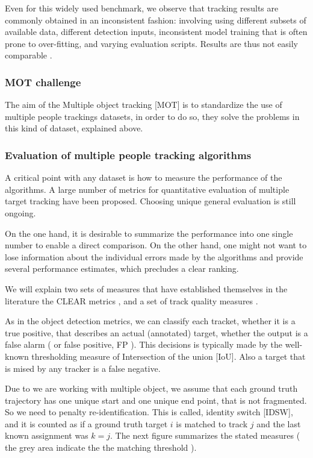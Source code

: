\documentclass[12pt, a4paper, titlepage,twoside,openright]{article}
\begin{document}
Even for this widely used benchmark, we observe that tracking results are commonly obtained in an inconsistent fashion: involving using different subsets of available data, different detection inputs, inconsistent model training that is often prone to over-fitting, and varying evaluation scripts. Results are thus not easily comparable \cite{mot}.


\subsubsection{MOT challenge}

The aim of the Multiple object tracking [MOT] is to standardize the use of multiple people trackings datasets, in order to do so, they solve the problems in this kind of dataset, explained above.


\subsubsection{Evaluation of multiple people tracking algorithms}

A critical point with any dataset is how to measure the performance of the algorithms. A large number of metrics for quantitative evaluation of multiple target tracking have been proposed. Choosing unique general evaluation is still ongoing. 

On the one hand, it is desirable to summarize the performance into one single number to enable a direct comparison. On the other hand, one might not want to lose information about the individual errors made by the algorithms and provide several performance estimates, which precludes a clear ranking.


We will explain two sets of measures that have established themselves in the literature the CLEAR metrics \cite{clear}, and a set of track quality measures \cite{wu}.

As in the object detection metrics, we can classify each tracket, whether it is a true positive, that describes an actual (annotated) target, whether the output is a false alarm ( or false positive, FP ). This decisions is typically made by the well-known thresholding measure of Intersection of the union [IoU]. Also a target that is mised by any tracker is a false negative.

Due to we are working with multiple object, we assume that each ground truth trajectory has one unique start and one unique end point, that is not fragmented. So we need to penalty re-identification. This is called, identity switch [IDSW], and it is counted as if a ground truth target $i$ is matched to track $j$ and the last known assignment was $ k = j$. The next figure summarizes the stated measures ( the grey area indicate the the matching threshold ).
\end{document}
